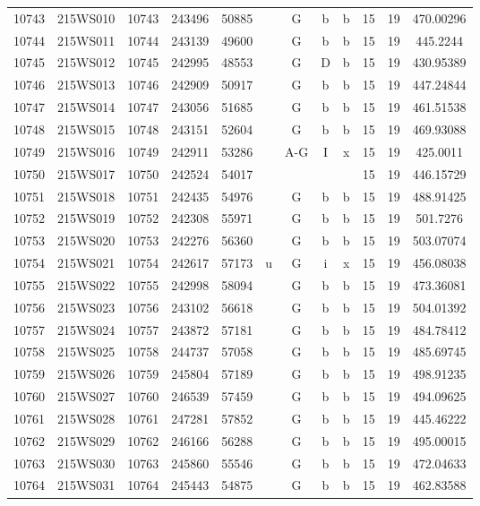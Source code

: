 \begin{tabular}{|*{12}{c|}}
10743 & 215WS010 & 10743 & 243496 & 50885 &  & G & b & b & 15 & 19 & 470.00296 \\ 
10744 & 215WS011 & 10744 & 243139 & 49600 &  & G & b & b & 15 & 19 & 445.2244 \\ 
10745 & 215WS012 & 10745 & 242995 & 48553 &  & G & D & b & 15 & 19 & 430.95389 \\ 
10746 & 215WS013 & 10746 & 242909 & 50917 &  & G & b & b & 15 & 19 & 447.24844 \\ 
10747 & 215WS014 & 10747 & 243056 & 51685 &  & G & b & b & 15 & 19 & 461.51538 \\ 
10748 & 215WS015 & 10748 & 243151 & 52604 &  & G & b & b & 15 & 19 & 469.93088 \\ 
10749 & 215WS016 & 10749 & 242911 & 53286 &  & A-G & I & x & 15 & 19 & 425.0011 \\ 
10750 & 215WS017 & 10750 & 242524 & 54017 &  &  &  &  & 15 & 19 & 446.15729 \\ 
10751 & 215WS018 & 10751 & 242435 & 54976 &  & G & b & b & 15 & 19 & 488.91425 \\ 
10752 & 215WS019 & 10752 & 242308 & 55971 &  & G & b & b & 15 & 19 & 501.7276 \\ 
10753 & 215WS020 & 10753 & 242276 & 56360 &  & G & b & b & 15 & 19 & 503.07074 \\ 
10754 & 215WS021 & 10754 & 242617 & 57173 & u & G & i & x & 15 & 19 & 456.08038 \\ 
10755 & 215WS022 & 10755 & 242998 & 58094 &  & G & b & b & 15 & 19 & 473.36081 \\ 
10756 & 215WS023 & 10756 & 243102 & 56618 &  & G & b & b & 15 & 19 & 504.01392 \\ 
10757 & 215WS024 & 10757 & 243872 & 57181 &  & G & b & b & 15 & 19 & 484.78412 \\ 
10758 & 215WS025 & 10758 & 244737 & 57058 &  & G & b & b & 15 & 19 & 485.69745 \\ 
10759 & 215WS026 & 10759 & 245804 & 57189 &  & G & b & b & 15 & 19 & 498.91235 \\ 
10760 & 215WS027 & 10760 & 246539 & 57459 &  & G & b & b & 15 & 19 & 494.09625 \\ 
10761 & 215WS028 & 10761 & 247281 & 57852 &  & G & b & b & 15 & 19 & 445.46222 \\ 
10762 & 215WS029 & 10762 & 246166 & 56288 &  & G & b & b & 15 & 19 & 495.00015 \\ 
10763 & 215WS030 & 10763 & 245860 & 55546 &  & G & b & b & 15 & 19 & 472.04633 \\ 
10764 & 215WS031 & 10764 & 245443 & 54875 &  & G & b & b & 15 & 19 & 462.83588 \\ 

\end{tabular}
